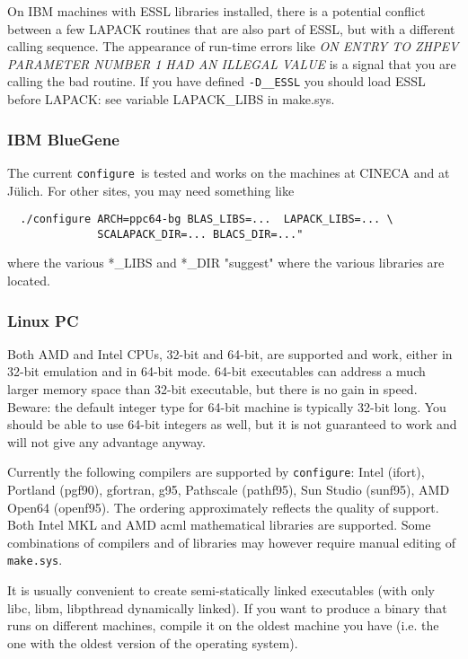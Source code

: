 \documentclass[12pt,a4paper]{article}
\def\configure{\texttt{configure}}
\begin{document}
On IBM machines with ESSL libraries installed, there is a 
potential conflict between a few LAPACK routines that are also part of ESSL, 
but with a different calling sequence. The appearance of run-time errors like {\em
    ON ENTRY TO ZHPEV  PARAMETER NUMBER  1 HAD AN ILLEGAL VALUE}
is a signal that you are calling the bad routine. If you have defined 
\texttt{-D\_\_ESSL} you should load ESSL before LAPACK: see
variable LAPACK\_LIBS in make.sys.

\subsubsection{IBM BlueGene}

The current \configure\ is tested and works on the machines at CINECA 
and at J\"ulich. For other sites, you may need something like
\begin{verbatim}
  ./configure ARCH=ppc64-bg BLAS_LIBS=...  LAPACK_LIBS=... \
              SCALAPACK_DIR=... BLACS_DIR=..."
\end{verbatim}
where the various *\_LIBS and *\_DIR "suggest" where the various libraries 
are located.

\subsubsection{Linux PC}

Both AMD and Intel CPUs, 32-bit and 64-bit, are supported and work,
either in 32-bit emulation and in 64-bit mode. 64-bit executables 
can address a much larger memory space than 32-bit executable, but
there is no gain in speed.
Beware: the default integer type for 64-bit machine is typically
32-bit long. You should be able to use 64-bit integers as well, 
but it is not guaranteed to work and will not give 
any advantage anyway.

Currently the following compilers are supported by \configure:
Intel (ifort), Portland (pgf90), gfortran, g95, Pathscale (pathf95), 
Sun Studio (sunf95),  AMD Open64 (openf95). The ordering approximately
reflects the quality of support. Both Intel MKL and AMD acml mathematical
libraries are supported. Some combinations of compilers and of libraries
may however require manual editing of \texttt{make.sys}.

It is usually convenient to create semi-statically linked executables (with only
libc, libm, libpthread dynamically linked). If you want to produce a binary
that runs on different machines, compile it on the oldest machine you have
(i.e. the one with the oldest version of the operating system).
\end{document}

